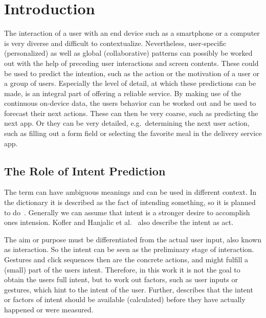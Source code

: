 \chapter{Introduction}
\label{sec:introduction}

The interaction of a user with an end device such as a smartphone or a computer is very diverse and difficult to contextualize.
Nevertheless, user-specific (personalized) as well as global (collaborative) patterns can possibly be worked out with the help of preceding user interactions and screen contents.
These could be used to predict the intention, such as the action or the motivation of a user or a group of users.
Especially the level of detail, at which these predictions can be made, is an integral part of offering a reliable service.
By making use of the continuous on-device data, the users behavior can be worked out and be used to forecast their next actions.
These can then be very coarse, such as predicting the next app.
Or they can be very detailed, e.g.\ determining the next user action, such as filling out a form field or selecting the favorite meal in the delivery service app.

\section{The Role of Intent Prediction}
\label{sec:role-intent-prediction}

The term  can have ambiguous meanings and can be used in different context.
In the dictionary it is described as the fact of intending something, so it is planned to do~\cite{dictionaryIntent}.
Generally we can assume that intent is a stronger desire to accomplish ones intension.
Kofler and Hanjalic et al.~\cite{kofler2016user} also describe the intent as  act.

The aim or purpose must be differentiated from the actual user input, also known as interaction.
So the intent can be seen as the preliminary stage of interaction.
Gestures and click sequences then are the concrete actions, and might fulfill a (small) part of the users intent.
Therefore, in this work it is not the goal to obtain the users full intent, but to work out factors, such as user inputs or gestures, which hint to the intent of the user.
Further,  describes that the intent or factors of intent should be available (calculated) before they have actually happened or were measured.

